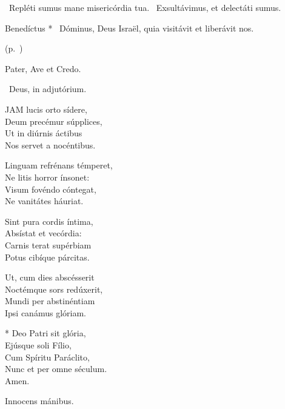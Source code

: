 \V\ Repléti sumus mane misericórdia tua. \R\ Exsultávimus, et delectáti sumus.

 Benedíctus * \textdagger\ Dóminus, Deus Israël, quia visitávit et liberávit nos.

 (p.~\pageref{feria2:precesferiales})


\sectionornament


Pater, Ave et Credo.

\V\ Deus, in adjutórium.


\lettrine[lines=2]{J}{AM} lucis orto sídere,\\
Deum precémur súpplices,\\
Ut in diúrnis áctibus\\
Nos servet a nocéntibus.

Linguam refrénans témperet,\\
Ne litis horror ínsonet:\\
Visum fovéndo cóntegat,\\
Ne vanitátes háuriat.

Sint pura cordis íntima,\\
Absístat et vecórdia:\\
Carnis terat supérbiam\\
Potus cibíque párcitas.

Ut, cum dies abscésserit\\
Noctémque sors redúxerit,\\
Mundi per abstinéntiam\\
Ipsi canámus glóriam.

* Deo Patri sit glória,\\
Ejúsque soli Fílio,\\
Cum Spíritu Paráclito,\\
Nunc et per omne séculum.\\
Amen.

  Innocens mánibus.


